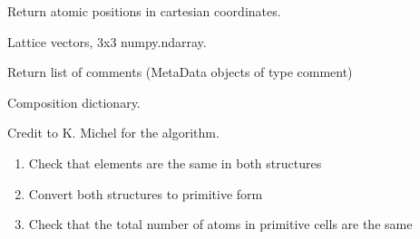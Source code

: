 \documentclass[letterpaper,10pt,english]{sphinxmanual}
\begin{document}
\begin{fulllineitems}
\begin{fulllineitems}
\end{fulllineitems}


\begin{fulllineitems}
\label{models:qmpy.Structure.cartesian_coords}
Return atomic positions in cartesian coordinates.

\end{fulllineitems}


\begin{fulllineitems}
\label{models:qmpy.Structure.cell}
Lattice vectors, 3x3 numpy.ndarray.

\end{fulllineitems}


\begin{fulllineitems}
\label{models:qmpy.Structure.comment_objects}
Return list of comments (MetaData objects of type comment)

\end{fulllineitems}


\begin{fulllineitems}
\label{models:qmpy.Structure.comp}
Composition dictionary.

\end{fulllineitems}


\begin{fulllineitems}
\label{models:qmpy.Structure.compare}
Credit to K. Michel for the algorithm.
\begin{enumerate}
\item {} 
Check that elements are the same in both structures

\item {} 
Convert both structures to primitive form

\item {} 
Check that the total number of atoms in primitive cells are the same


\end{enumerate}
\end{fulllineitems}
\end{fulllineitems}
\end{document}
